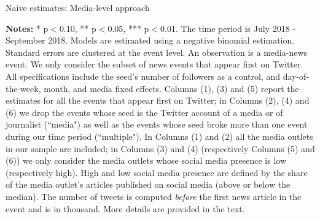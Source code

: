 \begin{table}
\caption{Naive estimates: Media-level approach}
\begin{center}
	
\end{center}
\begin{spacing}{0.5}
	{\fns \textbf{Notes:} * p$<$0.10, ** p$<$0.05, *** p$<$0.01. The time period is July 2018 - September 2018.  Models are estimated using a negative binomial estimation. Standard errors are clustered at the event level. An observation is a media-news event. We only consider the subset of news events that appear first on Twitter. All specifications include the seed's number of followers as a control, and day-of-the-week, month, and media fixed effects. Columns (1), (3) and (5) report the estimates for all the events that appear first on Twitter; in Columns (2), (4) and (6) we drop the events whose seed is the Twitter account of a media or of journalist (``media") as well as the events whose seed broke more than one event during our time period (``multiple"). In Columns (1) and (2) all the media outlets in our sample are included; in Columns (3) and (4) (respectively Columns (5) and (6)) we only consider the media outlets whose social media presence is low (respectively high). High and low social media presence are defined by the share of the media outlet's articles published on social media (above or below the median). The number of tweets is computed \textit{before} the first news article in the event and is in thousand. More details are provided in the text.} 
\end{spacing}
\label{Tab:number_articles_negbinomial_cevent}
\end{table} 



